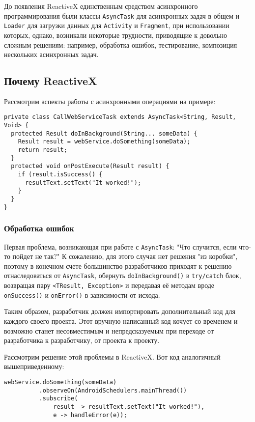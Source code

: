 \documentclass[12pt]{extarticle}
\begin{document}
До появления ReactiveX единственным средством асинхронного программирования были классы \texttt{AsyncTask} для асинхронных задач в общем и \texttt{Loader} для загрузки данных для \texttt{Activity} и \texttt{Fragment}, при использовании которых, однако, возникали некоторые трудности, приводящие к довольно сложным решениям: например, обработка ошибок, тестирование, композиция нескольких асинхронных задач.

\subsection{Почему ReactiveX}

Рассмотрим аспекты работы с асинхронными операциями на примере:

\begin{lstlisting}
private class CallWebServiceTask extends AsyncTask<String, Result, Void> {
  protected Result doInBackground(String... someData) {
    Result result = webService.doSomething(someData);
    return result;
  }
  protected void onPostExecute(Result result) {
    if (result.isSuccess() {
      resultText.setText("It worked!");
    }
  }
}
\end{lstlisting}

\subsubsection{Обработка ошибок}

Первая  проблема, возникающая при работе с \texttt{AsyncTask}: "Что случится, если что-то пойдет не так?" К сожалению, для этого случая нет решения "из коробки", поэтому в конечном счете большинство разработчиков приходят к решению отнаследоваться от \texttt{AsyncTask}, обернуть \texttt{doInBackground()} в \texttt{try/catch} блок, возвращая пару \texttt{<TResult, Exception>} и передавая её методам вроде \texttt{onSuccess()} и \texttt{onError()} в зависимости от исхода.

Таким образом, разработчик должен импортировать дополнительный код для каждого своего проекта. Этот вручную написанный код кочует со временем и возможно станет несовместимым и непредсказуемым при переходе от разработчика к разработчику, от проекта к проекту.

Рассмотрим решение этой проблемы в ReactiveX. Вот код аналогичный вышеприведенному:

\begin{lstlisting}
webService.doSomething(someData)
          .observeOn(AndroidSchedulers.mainThread())
          .subscribe(
              result -> resultText.setText("It worked!"),
              e -> handleError(e));
\end{lstlisting}
\end{document}
